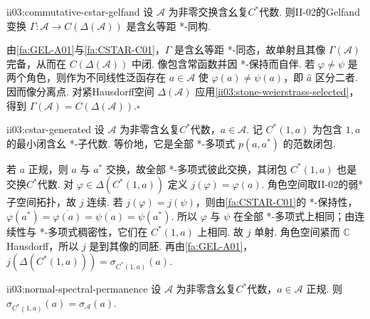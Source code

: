 \begin{FATheorem}{ii03:commutative-cstar-gelfand}
设 \(\displaystyle\mathcal A\) 为非零交换含幺复\(\displaystyle C^*\)代数. 则II-02的Gelfand变换
\(\displaystyle \Gamma:\mathcal A\longrightarrow C(\Delta(\mathcal A))\)
是含幺等距 *-同构.
\end{FATheorem}

\begin{FAProof}
由\autoref{fa:GEL-A01}与\autoref{fa:CSTAR-C01}，\(\displaystyle\Gamma\) 是含幺等距 *-同态，故单射且其像 \(\displaystyle\Gamma(\mathcal A)\) 完备，从而在 \(\displaystyle C(\Delta(\mathcal A))\) 中闭. 像包含常函数并因 *-保持而自伴. 若 \(\displaystyle\varphi\neq\psi\) 是两个角色，则作为不同线性泛函存在 \(\displaystyle a\in\mathcal A\) 使 \(\displaystyle\varphi(a)\neq\psi(a)\)，即 \(\displaystyle\widehat a\) 区分二者. 因而像分离点. 对紧Hausdorff空间 \(\displaystyle\Delta(\mathcal A)\) 应用\autoref{ii03:stone-weierstrass-selected}，得到 \(\displaystyle\Gamma(\mathcal A)=C(\Delta(\mathcal A))\).\hfill\(\square\)
\end{FAProof}

\begin{FADefinition}{ii03:cstar-generated}
设 \(\displaystyle\mathcal A\) 为非零含幺复\(\displaystyle C^*\)代数，\(\displaystyle a\in\mathcal A\). 记 \(\displaystyle C^*(1,a)\) 为包含 \(\displaystyle1,a\) 的最小闭含幺 *-子代数. 等价地，它是全部 *-多项式 \(\displaystyle p(a,a^*)\) 的范数闭包.
\end{FADefinition}

若 \(\displaystyle a\) 正规，则 \(\displaystyle a\) 与 \(\displaystyle a^*\) 交换，故全部 *-多项式彼此交换，其闭包 \(\displaystyle C^*(1,a)\) 也是交换\(\displaystyle C^*\)代数. 对 \(\displaystyle\varphi\in\Delta(C^*(1,a))\) 定义
\(\displaystyle j(\varphi)=\varphi(a).\)
角色空间取II-02的弱*子空间拓扑，故 \(\displaystyle j\) 连续. 若 \(\displaystyle j(\varphi)=j(\psi)\)，则由\autoref{fa:CSTAR-C01}的 *-保持性，
\(\displaystyle \varphi(a^*)=\overline{\varphi(a)} =\overline{\psi(a)}=\psi(a^*).\)
所以 \(\displaystyle\varphi\) 与 \(\displaystyle\psi\) 在全部 *-多项式上相同；由连续性与 *-多项式稠密性，它们在 \(\displaystyle C^*(1,a)\) 上相同. 故 \(\displaystyle j\) 单射. 角色空间紧而 \(\displaystyle\mathbb C\) Hausdorff，所以 \(\displaystyle j\) 是到其像的同胚. 再由\autoref{fa:GEL-A01}，
\(\displaystyle j(\Delta(C^*(1,a)))=\sigma_{C^*(1,a)}(a).\)

\begin{FAProposition}[B][正规元的谱保持]{ii03:normal-spectral-permanence}
设 \(\displaystyle\mathcal A\) 为非零含幺复\(\displaystyle C^*\)代数，\(\displaystyle a\in\mathcal A\) 正规. 则
\(\displaystyle \sigma_{C^*(1,a)}(a)=\sigma_{\mathcal A}(a).\)
\end{FAProposition}

